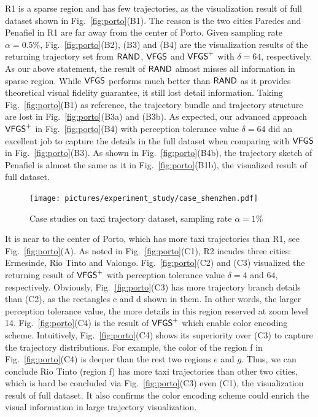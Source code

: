 R1 is a sparse region and has few trajectories, as the visualization result of full \pt{} dataset shown in Fig.~\ref{fig:porto}(B1).
The reason is the two cities Paredes and Penafiel in R1 are far away from the center of Porto.
Given sampling rate $\alpha=0.5\%$, Fig.~\ref{fig:porto}(B2), (B3) and (B4) are the visualization results of the returning trajectory set from $\mathsf{RAND}{}$, $\mathsf{VFGS}$ and $\mathsf{VFGS}^{+}$ with $\delta=64$, respectively.
As our above statement, the result of $\mathsf{RAND}$ almost misses all information in sparse region.
While $\mathsf{VFGS}$ performs much better than $\mathsf{RAND}$ as it provides theoretical visual fidelity guarantee, it still lost detail information.
Taking Fig.~\ref{fig:porto}(B1) as reference, the trajectory bundle and trajectory structure are lost in Fig.~\ref{fig:porto}(B3a) and (B3b).
As expected, our advanced approach $\mathsf{VFGS}^{+}$ in Fig.~\ref{fig:porto}(B4) with perception tolerance value $\delta=64$ did an excellent job to capture the details in the full dataset when comparing with $\mathsf{VFGS}$ in Fig.~\ref{fig:porto}(B3).
As shown in Fig.~\ref{fig:porto}(B4b), the trajectory sketch of Penafiel is almost the same as it in Fig.~\ref{fig:porto}(B1b), the visualized result of full dataset.


\begin{figure}[t]
	\centering
	\texttt{[image: pictures/experiment\_study/case\_shenzhen.pdf]}
	\vspace{-4mm}
	\caption{Case studies on \sz{} taxi trajectory dataset, sampling rate $\alpha = 1\%$}
	\label{fig:shenzhen}
    \vspace{-3mm}
\end{figure}

 It is near to the center of Porto, which has more taxi trajectories than R1, see Fig.~\ref{fig:porto}(A).
As noted in Fig.~\ref{fig:porto}(C1), R2 incudes three cities: Ermesinde, Rio Tinto and Valongo.
Fig.~\ref{fig:porto}(C2) and (C3) visualized the returning result of $\mathsf{VFGS}^{+}$ with perception tolerance value $\delta=4$ and $64$, respectively.
Obviously, Fig.~\ref{fig:porto}(C3) has more trajectory branch details than (C2), as the rectangles c and d shown in them.
In other words, the larger perception tolerance value, the more details in this region reserved at zoom level 14.
Fig.~\ref{fig:porto}(C4) is the result of $\mathsf{VFGS}^{+}$ which enable color encoding scheme.
Intuitively, Fig.~\ref{fig:porto}(C4) shows its superiority over (C3) to capture the trajectory distributions.
For example, the color of the region f in Fig.~\ref{fig:porto}(C4) is deeper than the rest two regions $e$ and $g$.
Thus, we can conclude Rio Tinto (region f) has more taxi trajectories than other two cities, which is hard be concluded via Fig.~\ref{fig:porto}(C3) even (C1), the visualization result of full dataset.
It also confirms the color encoding scheme could enrich the visual information in large trajectory visualization.

